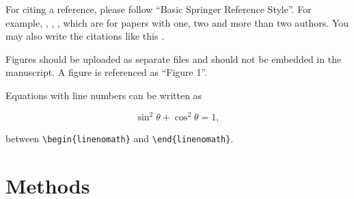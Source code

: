 \documentclass{EPS}
\begin{document}
For citing a reference, please follow
``Basic Springer Reference Style''.
For example,
\cite{Miller2009}, \cite{MS2001}, \cite{Milleretal1999},
which are for papers with one, two and more than two authors.
You may also write the citations like this
\citep[e.g.][]{Miller1998a,Miller1998b,MS2001,Milleretal1999}.

Figures should be uploaded as separate files and 
should not be embedded in the manuscript.
A figure is referenced as ``Figure 1''.

Equations with line numbers can be written as
\begin{linenomath}
 \begin{equation}
  \sin^2 \theta + \cos^2 \theta = 1 ,
 \end{equation}
\end{linenomath}
between \texttt{\textbackslash begin\{linenomath\}} and
\texttt{\textbackslash end\{linenomath\}}.




\section{Methods}
\end{document}
